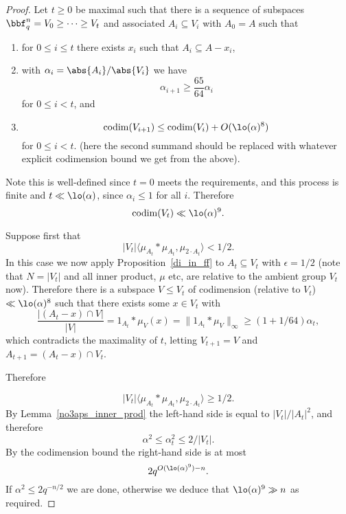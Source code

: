 \begin{proof}
  \leanok

  Let $t\geq 0$ be maximal such that there is a sequence of subspaces $\bbf_q^n=V_0\geq \cdots \geq V_t$ and associated $A_i\subseteq V_i$ with $A_0=A$ such that
  \begin{enumerate}
  \item for $0\leq i\leq t$ there exists $x_i$ such that $A_i\subseteq A-x_i$,
  \item with $\alpha_i=\abs{A_i}/\abs{V_i}$ we have
  \[\alpha_{i+1}\geq \frac{65}{64}\alpha_i\]
  for $0\leq i<t$, and
  \item \[\mathrm{codim} (V_{i+1}) \leq \mathrm{codim}(V_i)+O(\lo(\alpha)^8)\]
  for $0\leq i<t$. (here the second summand should be replaced with whatever explicit codimension bound we get from the above).
  \end{enumerate}

  Note this is well-defined since $t=0$ meets the requirements, and this process is finite and $t \ll \lo(\alpha)$, since $\alpha_i\leq 1$ for all $i$. Therefore
  \[\mathrm{codim}(V_t) \ll \lo(\alpha)^9.\]

  Suppose first that
  \[\lvert V_t\rvert\langle \mu_{A_t}\ast \mu_{A_t},\mu_{2\cdot A_t}\rangle<1/2.\]
  In this case we now apply Proposition~\ref{di_in_ff} to $A_t\subseteq V_t$ with $\epsilon=1/2$ (note that $N=\lvert V_t\rvert$ and all inner product, $\mu$ etc, are relative to the ambient group $V_t$ now). Therefore there is a subspace $V\leq V_t$ of codimension (relative to $V_t$) $\ll \lo(\alpha)^8$ such that there exists some $x\in V_t$ with
  \[\frac{\lvert (A_t-x)\cap V\rvert}{\lvert V\rvert}=1_{A_t}\ast \mu_V(x)=\| 1_{A_t}\ast \mu_V\|_\infty \geq (1+1/64)\alpha_t,\]
  which contradicts the maximality of $t$, letting $V_{t+1}=V$ and $A_{t+1}=(A_t-x)\cap V_t$.

  Therefore

  \[\lvert V_t\rvert\langle \mu_{A_t}\ast \mu_{A_t},\mu_{2\cdot A_t}\rangle\geq 1/2.\]
  By Lemma~\ref{no3aps_inner_prod} the left-hand side is equal to $\lvert V_t\rvert/\lvert A_t\rvert^2$, and therefore
  \[\alpha^2 \leq \alpha_t^2 \leq 2/\lvert V_t\rvert.\]
  By the codimension bound the right-hand side is at most
  \[2q^{O(\lo(\alpha)^9)-n}.\]
  If $\alpha^2 \leq 2q^{-n/2}$ we are done, otherwise we deduce that $\lo(\alpha)^9 \gg n$ as required.
\end{proof}
